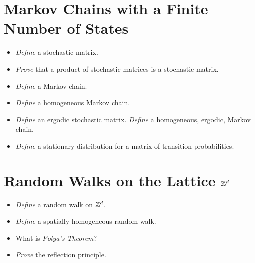 \documentclass{article}
\newcommand{\cold}{{\color{babyblue}{\Snowflake}}}
\newcommand{\prac}{{\color{arsenic}{\ding{43}}}}
\newcommand{\know}{{\color{arylideyellow}{\Lightning}}}
\begin{document}
\section{Markov Chains with a Finite Number of States}
\begin{itemize}[nosep]
    \item[\cold] \textit{Define} a stochastic matrix. 
    \item[\cold] \textit{Prove} that a product of stochastic matrices is a stochastic matrix. 
    \item[\cold] \textit{Define} a Markov chain.
    \item[\cold] \textit{Define} a homogeneous Markov chain.
    \item[\cold] \textit{Define} an ergodic stochastic matrix. \textit{Define} a homogeneous, ergodic, Markov chain.
    \item[\cold] \textit{Define} a stationary distribution for a matrix of transition probabilities. 
\end{itemize}

\section{Random Walks on the Lattice $\mathbb{Z}^d$}
\begin{itemize}[nosep]
    \item[\cold] \textit{Define} a random walk on $\mathbb{Z}^d$. 
    \item[\cold] \textit{Define} a spatially homogeneous random walk.
    \item[\know] What is \textit{Polya's Theorem}?
    \item[\prac] \textit{Prove} the reflection principle.
\end{itemize}
\end{document}

